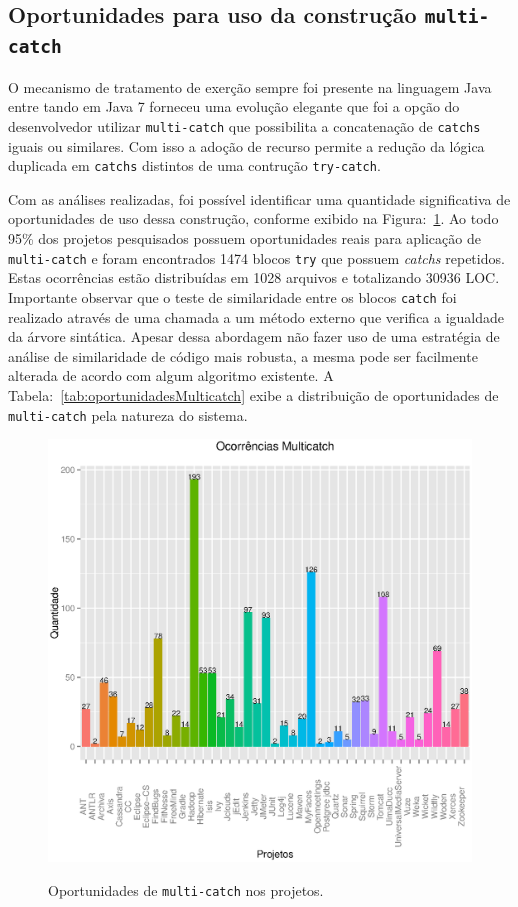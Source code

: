 \subsection{Oportunidades para uso da constru\c c\~{a}o \texttt{multi-catch}}

O mecanismo de tratamento de exerção sempre foi presente na linguagem Java entre tando em Java 7 forneceu uma evolução elegante que foi a opção do desenvolvedor utilizar \texttt{multi-catch} que possibilita a concatenação de \texttt{catchs} iguais ou similares. Com isso a adoção de recurso permite a redução da lógica duplicada em \texttt{catchs} distintos de uma contrução \texttt{try-catch}.

Com as análises realizadas, foi possível identificar uma quantidade significativa de oportunidades 
de uso dessa construção, conforme exibido na Figura:~\ref{fig:Muticatch}. Ao todo \num{95}\% dos projetos pesquisados possuem oportunidades reais para aplicação de \texttt{multi-catch} e
foram encontrados \num{1474} blocos \texttt{try} que possuem \textit{catchs} repetidos. 
Estas ocorrências estão distribuídas em \num{1028} arquivos e totalizando \num{30936} \acs{LOC}. 
Importante observar que o teste de  similaridade entre os blocos \texttt{catch} 
foi realizado através de uma chamada a um método externo que verifica a igualdade da árvore 
sintática. Apesar dessa abordagem não fazer uso de uma estratégia de análise 
de similaridade de código mais robusta, a mesma pode ser facilmente alterada de 
acordo com algum algoritmo existente. A Tabela:~\ref{tab:oportunidadesMulticatch} exibe a distribuição de oportunidades de \texttt{multi-catch} pela natureza do sistema.

\begin{figure}[h]
	\center
	\includegraphics[scale=0.75]{Imagens/ocorrenciasMulticatch}
	\label{fig:Muticatch}
	\caption{Oportunidades de \texttt{multi-catch} nos projetos.}
\end{figure}
	
